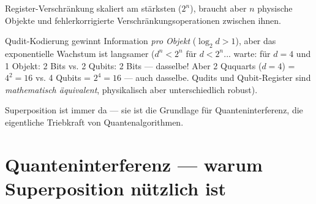 \begin{center}
\end{center}

\begin{keypoint}
Register-Verschränkung skaliert am stärksten ($2^n$),
braucht aber $n$ physische Objekte und fehlerkorrigierte
Verschränkungsoperationen zwischen ihnen.

Qudit-Kodierung gewinnt Information \emph{pro Objekt}
($\log_2 d > 1$), aber das exponentielle
Wachstum ist langsamer ($d^n < 2^n$ für $d < 2^n$... 
warte: für $d=4$ und 1 Objekt: 2 Bits vs. 2 Qubits: 2 Bits ---
dasselbe! Aber 2 Ququarts ($d=4$) = $4^2=16$
vs. 4 Qubits = $2^4=16$ --- auch dasselbe.
Qudits und Qubit-Register sind \emph{mathematisch äquivalent},
physikalisch aber unterschiedlich robust).

Superposition ist immer da --- sie ist die Grundlage
für Quanteninterferenz, die eigentliche Triebkraft
von Quantenalgorithmen.
\end{keypoint}

\section{Quanteninterferenz --- warum Superposition nützlich ist}
\label{sec:interferenz}

